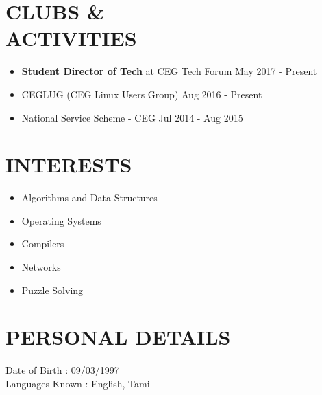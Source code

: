\documentclass[margin, 10pt]{res} %
\begin{document}
\begin{resume}

    \section{CLUBS \& \\ ACTIVITIES}
    \begin{itemize}
        \item \textbf{Student Director of Tech} at CEG Tech Forum \hfill May 2017 - Present
        \item CEGLUG (CEG Linux Users Group) \hfill Aug 2016 - Present
        \item National Service Scheme - CEG \hfill Jul 2014 - Aug 2015
    \end{itemize} 

    \section{INTERESTS} 
    \begin{itemize}
        \item Algorithms and Data Structures
        \item Operating Systems
        \item Compilers
        \item Networks
        \item Puzzle Solving
    \end{itemize}

    \section{PERSONAL DETAILS}
    Date of Birth \hspace{18pt} : 09/03/1997 \\
    Languages Known \hspace{1pt}: English, Tamil
\end{resume}
\end{document}
